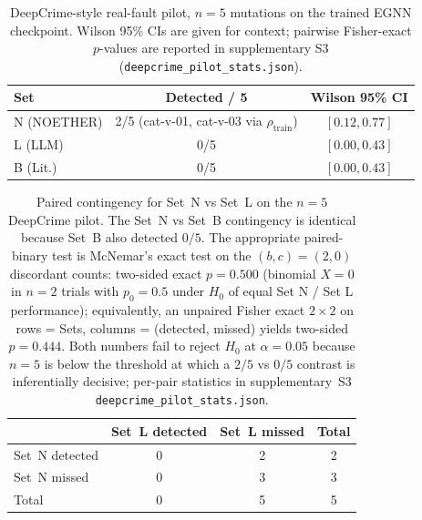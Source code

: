 \documentclass[acmsmall, screen]{acmart}
\begin{document}
\begin{table}[h]
\centering
\caption{DeepCrime-style real-fault pilot, $n=5$ mutations on the trained EGNN checkpoint. Wilson 95\% CIs are given for context; pairwise Fisher-exact $p$-values are reported in supplementary S3 (\texttt{deepcrime\_pilot\_stats.json}).}
\label{tab:pilot}
\small
\begin{tabular}{lcc}
\toprule
\textbf{Set} & \textbf{Detected / 5} & \textbf{Wilson 95\% CI} \\
\midrule
N (NOETHER) & 2/5 (cat-v-01, cat-v-03 via $\rho_{\mathrm{train}}$) & $[0.12, 0.77]$ \\
L (LLM)     & 0/5                                           & $[0.00, 0.43]$ \\
B (Lit.)    & 0/5                                           & $[0.00, 0.43]$ \\
\bottomrule
\end{tabular}
\end{table}

\begin{table}[h]
\centering
\caption{Paired contingency for Set~N vs Set~L on the $n=5$ DeepCrime
pilot. The Set~N vs Set~B contingency is identical because Set~B also
detected $0/5$. The appropriate paired-binary test is McNemar's exact
test on the $(b, c) = (2, 0)$ discordant counts: two-sided exact
$p = 0.500$ (binomial $X = 0$ in $n = 2$ trials with $p_0 = 0.5$ under
$H_0$ of equal Set N / Set L performance); equivalently, an unpaired
Fisher exact $2\times 2$ on rows = Sets, columns = (detected, missed)
yields two-sided $p = 0.444$. Both numbers fail to reject $H_0$ at
$\alpha = 0.05$ because $n = 5$ is below the threshold at which a
$2 / 5$ vs $0 / 5$ contrast is inferentially decisive; per-pair
statistics in supplementary~S3 \texttt{deepcrime\_pilot\_stats.json}.}
\label{tab:deepcrime-contingency}
\small
\begin{tabular}{l c c c}
\toprule
                  & Set~L detected & Set~L missed & Total \\
\midrule
Set~N detected    & 0              & 2            & 2 \\
Set~N missed      & 0              & 3            & 3 \\
\midrule
Total             & 0              & 5            & 5 \\
\bottomrule
\end{tabular}
\end{table}
\end{document}

